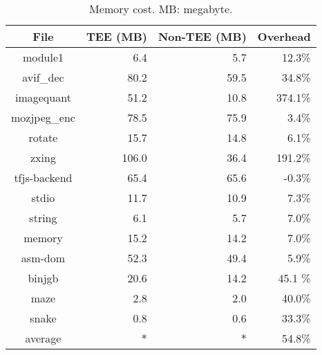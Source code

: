 \begin{table}[htbp]
\centering
\caption{Memory cost. MB: megabyte.}\label{tab:memory}
\begin{tabular}{c r r r}
\toprule
\textbf{File} & \textbf{TEE (MB)} & \textbf{Non-TEE (MB)} & \textbf{Overhead} \\
\midrule

module1 & 6.4 & 5.7 & 12.3\% \\

avif\_dec & 80.2 & 59.5 & 34.8\% \\

imagequant & 51.2 & 10.8 & 374.1\% \\

mozjpeg\_enc & 78.5 & 75.9 & 3.4\% \\

rotate & 15.7 & 14.8 & 6.1\% \\

zxing & 106.0 & 36.4 & 191.2\% \\

tfjs-backend & 65.4 & 65.6 & -0.3\% \\

stdio & 11.7 & 10.9 & 7.3\% \\

string & 6.1 & 5.7 & 7.0\% \\

memory & 15.2 & 14.2 & 7.0\% \\

asm-dom & 52.3 & 49.4 & 5.9\% \\

binjgb & 20.6 & 14.2 & 45.1 \% \\

maze & 2.8 & 2.0 & 40.0\% \\

snake & 0.8 & 0.6 & 33.3\% \\

\midrule
average & $\ast$ & $\ast$ & 54.8\% \\

\bottomrule
\end{tabular}
\end{table}